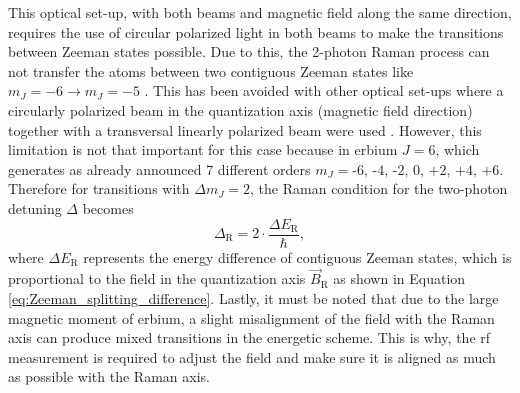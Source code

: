 This optical set-up, with both beams and magnetic field along the same direction, requires the use of circular polarized light in both beams to make the transitions between Zeeman states possible. Due to this, the 2-photon Raman process can not transfer the atoms between two contiguous Zeeman states like $m_J=-6 \rightarrow m_J=-5$ \cite{Foot2005}. This has been avoided with other optical set-ups where a circularly polarized beam in the quantization axis (magnetic field direction) together with a transversal linearly polarized beam were used \cite{Debs2009}. However, this limitation is not that important for this case because in erbium $J=6$, which generates as already announced 7 different orders $m_J = \text{-6, -4, -2, 0, +2, +4, +6}$. Therefore for transitions with $\Delta m_{J} = 2$, the Raman condition for the two-photon detuning $\Delta$ becomes
\begin{equation}\label{eq:raman_condition}
	\Delta_\text{R} = 2\cdot\frac{\Delta E_\text{R}}{\hbar},
\end{equation}
where $\Delta E_\text{R}$ represents the energy difference of contiguous Zeeman states, which is proportional to the field in the quantization axis $\vec{B}_\text{R}$ as shown in Equation \ref{eq:Zeeman_splitting_difference}. Lastly, it must be noted that due to the large magnetic moment of erbium, a slight misalignment of the field with the Raman axis can produce mixed transitions in the energetic scheme. This is why, the \ac{rf} measurement is required to adjust the field and make sure it is aligned as much as possible with the Raman axis. %

